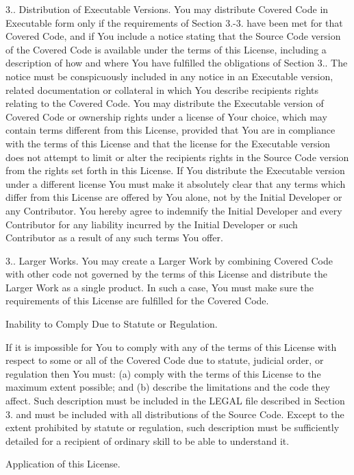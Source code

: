 \begin{DoxyEnumerate}
3.. Distribution of Executable Versions. You may distribute Covered Code in Executable form only if the requirements of Section 3.-\/3. have been met for that Covered Code, and if You include a notice stating that the Source Code version of the Covered Code is available under the terms of this License, including a description of how and where You have fulfilled the obligations of Section 3.. The notice must be conspicuously included in any notice in an Executable version, related documentation or collateral in which You describe recipients\textquotesingle{} rights relating to the Covered Code. You may distribute the Executable version of Covered Code or ownership rights under a license of Your choice, which may contain terms different from this License, provided that You are in compliance with the terms of this License and that the license for the Executable version does not attempt to limit or alter the recipient\textquotesingle{}s rights in the Source Code version from the rights set forth in this License. If You distribute the Executable version under a different license You must make it absolutely clear that any terms which differ from this License are offered by You alone, not by the Initial Developer or any Contributor. You hereby agree to indemnify the Initial Developer and every Contributor for any liability incurred by the Initial Developer or such Contributor as a result of any such terms You offer.

3.. Larger Works. You may create a Larger Work by combining Covered Code with other code not governed by the terms of this License and distribute the Larger Work as a single product. In such a case, You must make sure the requirements of this License are fulfilled for the Covered Code.
\item Inability to Comply Due to Statute or Regulation.

If it is impossible for You to comply with any of the terms of this License with respect to some or all of the Covered Code due to statute, judicial order, or regulation then You must\+: (a) comply with the terms of this License to the maximum extent possible; and (b) describe the limitations and the code they affect. Such description must be included in the L\+E\+G\+A\+L file described in Section 3. and must be included with all distributions of the Source Code. Except to the extent prohibited by statute or regulation, such description must be sufficiently detailed for a recipient of ordinary skill to be able to understand it.
\item Application of this License.


\end{DoxyEnumerate}
